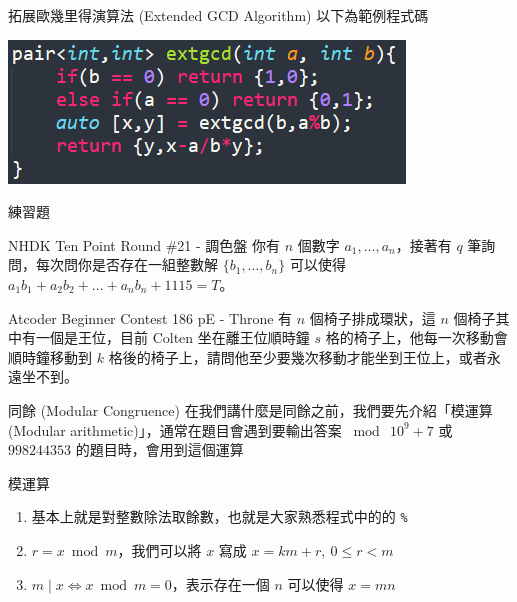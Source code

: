 \documentclass[aspectratio=169]{beamer}
\begin{document}
\begin{frame}{拓展歐幾里得演算法 (Extended GCD Algorithm)}
    以下為範例程式碼
    \begin{center}
        \includegraphics[]{images/code7.png}
    \end{center}
\end{frame}

\begin{frame}{練習題}
    \begin{block}{NHDK Ten Point Round \#21 - 調色盤}
        你有 $n$ 個數字 $a_1, \ldots, a_n$，接著有 $q$ 筆詢問，每次問你是否存在一組整數解 $\{b_1,\ldots,b_n\}$ 可以使得 $a_1b_1 + a_2b_2 + \dots + a_nb_n + 1115 = T$。
    \end{block}
    \begin{block}{Atcoder Beginner Contest 186 pE - Throne}
        有 $n$ 個椅子排成環狀，這 $n$ 個椅子其中有一個是王位，目前 Colten 坐在離王位順時鐘 $s$ 格的椅子上，他每一次移動會順時鐘移動到 $k$ 格後的椅子上，請問他至少要幾次移動才能坐到王位上，或者永遠坐不到。
    \end{block}
\end{frame}

\begin{frame}{同餘 (Modular Congruence)}
    在我們講什麼是同餘之前，我們要先介紹「模運算 (Modular arithmetic)」，通常在題目會遇到要輸出答案 $\bmod \ 10^9+7$ 或 $998244353$ 的題目時，會用到這個運算
    \begin{alertblock}{模運算}
        \begin{enumerate}
            \item 基本上就是對整數除法取餘數，也就是大家熟悉程式中的的 \texttt{\%}
            \item $r = x \bmod m$，我們可以將 $x$ 寫成 $x = km + r, \ 0 \le r < m$ 
            \item $m \mid x \iff x \bmod m = 0$，表示存在一個 $n$ 可以使得 $x = mn$
        \end{enumerate}
    \end{alertblock}
\end{frame}
\end{document}
